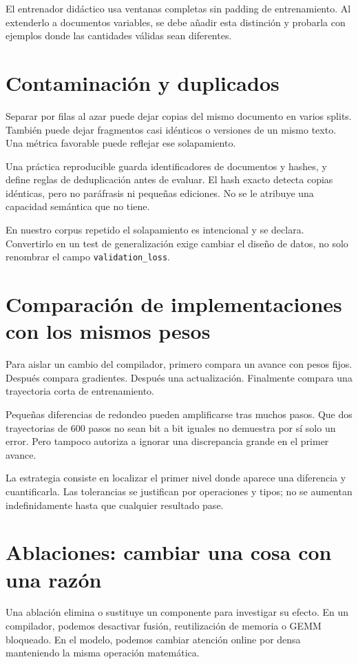 \documentclass[12pt,a4paper,oneside]{report}
\begin{document}
El entrenador didáctico usa ventanas completas sin padding de entrenamiento. Al extenderlo a documentos variables, se debe añadir esta distinción y probarla con ejemplos donde las cantidades válidas sean diferentes.

\section{Contaminación y duplicados}
Separar por filas al azar puede dejar copias del mismo documento en varios splits. También puede dejar fragmentos casi idénticos o versiones de un mismo texto. Una métrica favorable puede reflejar ese solapamiento.

Una práctica reproducible guarda identificadores de documentos y hashes, y define reglas de deduplicación antes de evaluar. El hash exacto detecta copias idénticas, pero no paráfrasis ni pequeñas ediciones. No se le atribuye una capacidad semántica que no tiene.

En nuestro corpus repetido el solapamiento es intencional y se declara. Convertirlo en un test de generalización exige cambiar el diseño de datos, no solo renombrar el campo \texttt{validation\_loss}.

\section{Comparación de implementaciones con los mismos pesos}
Para aislar un cambio del compilador, primero compara un avance con pesos fijos. Después compara gradientes. Después una actualización. Finalmente compara una trayectoria corta de entrenamiento.

Pequeñas diferencias de redondeo pueden amplificarse tras muchos pasos. Que dos trayectorias de 600 pasos no sean bit a bit iguales no demuestra por sí solo un error. Pero tampoco autoriza a ignorar una discrepancia grande en el primer avance.

La estrategia consiste en localizar el primer nivel donde aparece una diferencia y cuantificarla. Las tolerancias se justifican por operaciones y tipos; no se aumentan indefinidamente hasta que cualquier resultado pase.

\section{Ablaciones: cambiar una cosa con una razón}
Una ablación elimina o sustituye un componente para investigar su efecto. En un compilador, podemos desactivar fusión, reutilización de memoria o GEMM bloqueado. En el modelo, podemos cambiar atención online por densa manteniendo la misma operación matemática.
\end{document}
